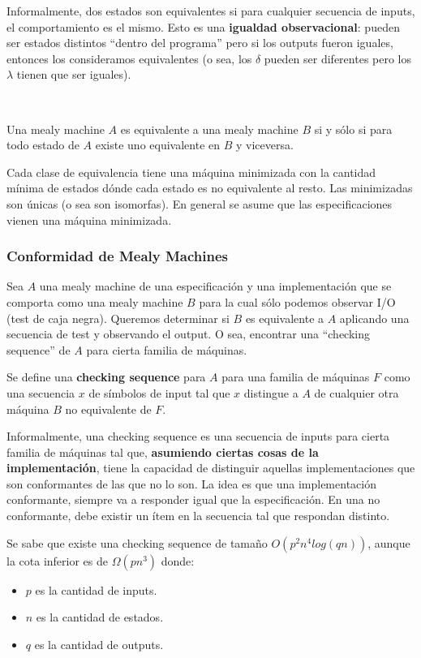 \documentclass[]{article}
\begin{document}
Informalmente, dos estados son equivalentes si para cualquier secuencia de inputs, el comportamiento es el mismo. Esto es una \textbf{igualdad observacional}: pueden ser estados distintos ``dentro del programa'' pero si los outputs fueron iguales, entonces los consideramos equivalentes (o sea, los $\delta$ pueden ser diferentes pero los $\lambda$ tienen que ser iguales).

~\newline

Una mealy machine $A$ es equivalente a una mealy machine $B$ si y sólo si para todo estado de $A$ existe uno equivalente en $B$ y viceversa.

Cada clase de equivalencia tiene una máquina minimizada con la cantidad mínima de estados dónde cada estado es no equivalente al resto. Las minimizadas son únicas (o sea son isomorfas). En general se asume que las especificaciones vienen una máquina minimizada.

\subsubsection{Conformidad de Mealy Machines}
Sea $A$ una mealy machine de una especificación y una implementación que se comporta como una mealy machine $B$ para la cual sólo podemos observar I/O (test de caja negra). Queremos determinar si $B$ es equivalente a $A$ aplicando una secuencia de test y observando el output. O sea, encontrar una ``checking sequence'' de $A$ para cierta familia de máquinas.

Se define una \textbf{checking sequence} para $A$ para una familia de máquinas $F$ como una secuencia $x$ de símbolos de input tal que $x$ distingue a $A$ de cualquier otra máquina $B$ no equivalente de $F$.

Informalmente, una checking sequence es una secuencia de inputs para cierta familia de máquinas tal que, \textbf{asumiendo ciertas cosas de la implementación}, tiene la capacidad de distinguir aquellas implementaciones que son conformantes de las que no lo son. La idea es que una implementación conformante, siempre va a responder igual que la especificación. En una no conformante, debe existir un ítem en la secuencia tal que respondan distinto.

Se sabe que existe una checking sequence de tamaño $O(p^2n^4log(qn))$, aunque la cota inferior es de $\Omega(pn^3)$ donde:
\begin{itemize}
	\item $p$ es la cantidad de inputs.
	\item $n$ es la cantidad de estados.
	\item $q$ es la cantidad de outputs.
\end{itemize}
\end{document}
